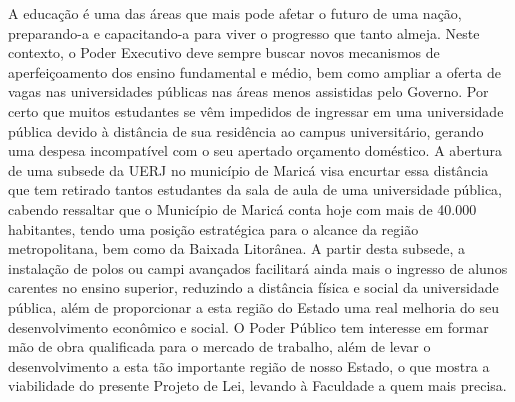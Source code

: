 \documentclass[10pt]{article}
\begin{document}
  A educação é uma das áreas que mais pode afetar o futuro de uma nação, preparando-a e capacitando-a para viver o progresso que tanto almeja.   Neste contexto, o Poder Executivo deve sempre buscar novos mecanismos de aperfeiçoamento dos ensino fundamental e médio, bem como ampliar a oferta de vagas nas universidades públicas nas áreas menos assistidas pelo Governo.   Por certo que muitos estudantes se vêm impedidos de ingressar em uma universidade pública devido à distância de sua residência ao campus universitário, gerando uma despesa incompatível com o seu apertado orçamento doméstico.   A abertura de uma subsede da UERJ no município de Maricá visa encurtar essa distância que tem retirado tantos estudantes da sala de aula de uma universidade pública, cabendo ressaltar que o Município de Maricá conta hoje com mais de 40.000 habitantes, tendo uma posição estratégica para o alcance da região metropolitana, bem como da Baixada Litorânea.   A partir desta subsede, a instalação de  polos ou campi avançados facilitará ainda mais o ingresso de alunos carentes no ensino superior, reduzindo a distância física e social da universidade pública, além de proporcionar a esta região do Estado uma real melhoria do seu desenvolvimento econômico e social.     O Poder Público tem interesse em formar mão de obra qualificada para o mercado de trabalho, além de levar o desenvolvimento a esta tão importante região de nosso Estado, o que mostra a viabilidade do presente Projeto de Lei, levando à Faculdade a quem mais precisa.




\iffalse
\begin{center}
  \textbf{REFERÊNCIAS}
\end{center}


\fi
\end{document}
